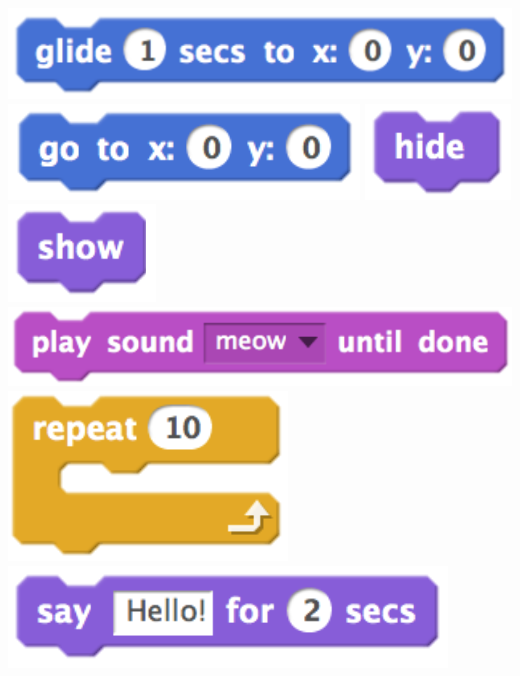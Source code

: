 \documentclass[a4paper,12pt]{article}
\begin{document}
    \includegraphics[height=0.04\paperheight]{glide.png}
    \includegraphics[height=0.04\paperheight]{go.png}
    \includegraphics[height=0.04\paperheight]{hide.png}
    \includegraphics[height=0.04\paperheight]{show.png}
    \\\includegraphics[height=0.04\paperheight]{playSound.png}
    \includegraphics[height=0.08\paperheight]{repeat.png}
    \includegraphics[height=0.045\paperheight]{say.png}
\end{document}

